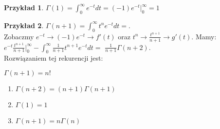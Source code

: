 \documentclass{article}
\theoremstyle{definition}
\theoremstyle{definition}
\theoremstyle{definition}
\newtheorem{pk}{Przykład}[subsection]
\theoremstyle{definition}
\begin{document}
\begin{pk}
    $\Gamma(1)=\int_{0}^{\infty} e^{-t} dt = (-1)e^{-t}|_{0}^{\infty} = 1$\\
\end{pk}

\begin{pk}
    $\Gamma(n+1)=\int_{0}^{\infty} t^{n} e^{-t} dt =$. \\
    Zobaczmy $e^{-t}\rightarrow (-1)e^{-t} \rightarrow f'(t)$ oraz $t^n \rightarrow \frac{t^{n+1}}{n+1} \rightarrow g'(t)$. Mamy:
    $e^{-t}\frac{t^{n+1}}{n+1}|_{0}^{\infty} - \int_{0}^{\infty} \frac{1}{n+1} t^{n+1} e^{-t} dt =$
    $\frac{1}{n+1} \Gamma(n+2)$. \\
    Rozwiązaniem tej rekurencji jest:\\
    \begin{center}
        $\Gamma(n+1)=n!$
    \end{center}
    \begin{enumerate}
        \item $\Gamma(n+2)=(n+1)\Gamma(n+1)$
        \item $\Gamma(1)=1$
        \item $\Gamma(n+1)=n\Gamma(n)$
    \end{enumerate}
\end{pk}
\end{document}
